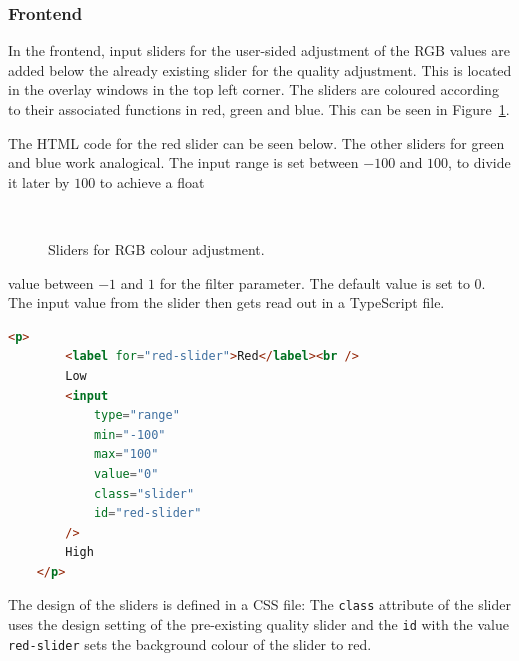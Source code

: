\documentclass[../MasterThesis.tex]{subfiles}
\begin{document}
\subsubsection*{Frontend}
%
\vspace*{-0em}
\begin{minipage}{0.48\textwidth}
In the frontend, input sliders for the user-sided adjustment of the RGB values are added below the already existing slider for the quality adjustment. This is located in the overlay windows in the top left corner. The sliders are coloured according to their associated functions in red, green and blue. This can be seen in Figure~\ref{figure:sliders}.

The HTML code for the red slider can be seen below. The other sliders for green and blue work analogical. The input range is set between $-100$ and $100$, to divide it later by $100$ to achieve a float 




\end{minipage}\begin{minipage}{0.04\textwidth}
\ 
\end{minipage}\begin{minipage}{0.48\textwidth}
\begin{figure}[H]
	\begin{center}
		\caption[Sliders for RGB colour adjustment.]{Sliders for RGB colour adjustment.}
		\label{figure:sliders}
	\end{center}
\end{figure}
\hfill
\end{minipage}

\vspace*{-1.3em}
value between $-1$ and $1$ for the filter parameter. The default value is set to $0$. The input value from the slider then gets read out in a TypeScript file.  


\begin{lstlisting}[language=html, numbers=none]
	<p>
		<label for="red-slider">Red</label><br />
		Low
		<input
			type="range"
			min="-100"
			max="100"
			value="0"
			class="slider"
			id="red-slider"
		/>
		High
	</p>
\end{lstlisting}

The design of the sliders is defined in a CSS file: The \texttt{class} attribute of the slider uses the design setting of the pre-existing quality slider and the \texttt{id} with the value \texttt{red-slider} sets the background colour of the slider to red. 
\end{document}
